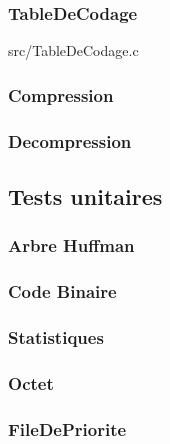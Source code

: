 \documentclass{article}
\begin{document}
\subsubsection{\textbf{TableDeCodage}}
src/{TableDeCodage.c}

\subsubsection{\textbf{Compression}}


\subsubsection{\textbf{Decompression}}


\subsection{Tests unitaires}

\subsubsection{\textbf{Arbre Huffman}}


\subsubsection{\textbf{Code Binaire}}


\subsubsection{\textbf{Statistiques}}


\subsubsection{\textbf{Octet}}


\subsubsection{\textbf{FileDePriorite}}

\end{document}
